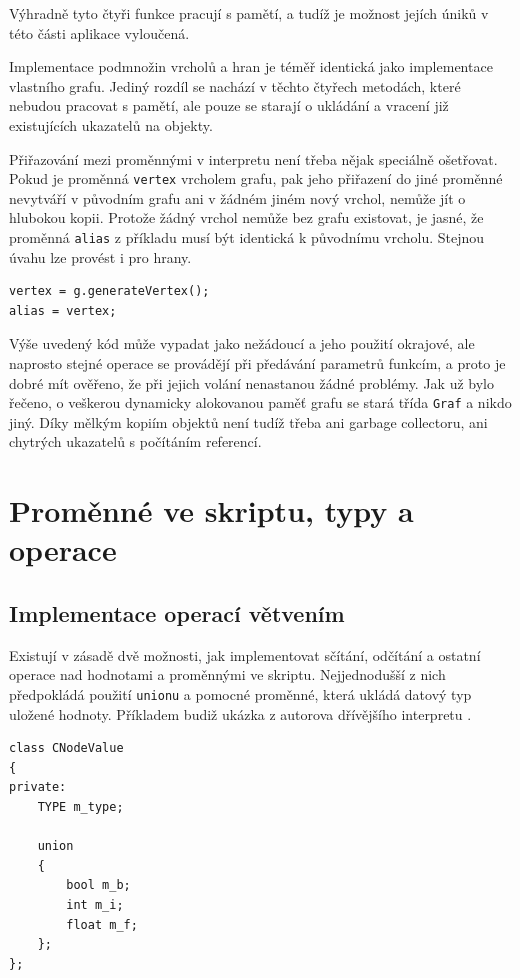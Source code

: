 \documentclass[11pt,twoside,a4paper]{book}
\begin{document}
Výhradně tyto čtyři funkce pracují s pamětí, a tudíž je možnost jejích úniků v této části aplikace vyloučená.

Implementace podmnožin vrcholů a hran je téměř identická jako implementace vlastního grafu. Jediný rozdíl se nachází v těchto čtyřech metodách, které nebudou pracovat s pamětí, ale pouze se starají o ukládání a vracení již existujících ukazatelů na objekty.

Přiřazování mezi proměnnými v interpretu není třeba nějak speciálně ošetřovat. Pokud je proměnná \texttt{vertex} vrcholem grafu, pak jeho přiřazení do jiné proměnné nevytváří v původním grafu ani v žádném jiném nový vrchol, nemůže jít o hlubokou kopii. Protože žádný vrchol nemůže bez grafu existovat, je jasné, že proměnná \texttt{alias} z příkladu musí být identická k původnímu vrcholu. Stejnou úvahu lze provést i pro hrany.

\begin{verbatim}
vertex = g.generateVertex();
alias = vertex;
\end{verbatim}

Výše uvedený kód může vypadat jako nežádoucí a jeho použití okrajové, ale naprosto stejné operace se provádějí při předávání parametrů funkcím, a proto je dobré mít ověřeno, že při jejich volání nenastanou žádné problémy. Jak už bylo řečeno, o veškerou dynamicky alokovanou paměť grafu se stará třída \texttt{Graf} a nikdo jiný. Díky mělkým kopiím objektů není tudíž třeba ani garbage collectoru, ani chytrých ukazatelů s počítáním referencí.


\section{Proměnné ve skriptu, typy a operace}

\subsection{Implementace operací větvením}

Existují v zásadě dvě možnosti, jak implementovat sčítání, odčítání a ostatní operace nad hodnotami a proměnnými ve skriptu. Nejjednodušší z nich předpokládá použití \texttt{unionu} a pomocné proměnné, která ukládá datový typ uložené hodnoty. Příkladem budiž ukázka z autorova dřívějšího interpretu \cite[třída \texttt{CNodeValue}]{borsch}.

\begin{verbatim}
class CNodeValue
{
private:
    TYPE m_type;

    union
    {
        bool m_b;
        int m_i;
        float m_f;
    };
};
\end{verbatim}
\end{document}
